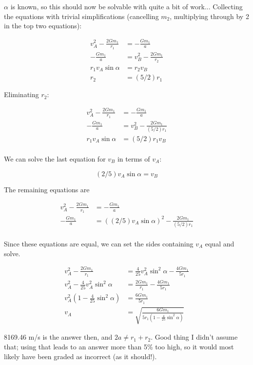 \documentclass[8.01x]{subfiles}
\begin{document}
$\alpha$ is known, so this should now be solvable with quite a bit of work... Collecting the equations with trivial simplifications (cancelling $m_2$, multiplying through by 2 in the top two equations):

\begin{align}
v_A^2 - \frac{2 G m_1}{r_1} &= -\frac{G m_1}{a}\\
-\frac{G m_1}{a} &= v_B^2 - \frac{2 G m_1}{r_2}\\
r_1 v_A \sin \alpha &= r_2 v_B\\
r_2 &= (5/2) r_1
\end{align}

Eliminating $r_2$:

\begin{align}
v_A^2 - \frac{2 G m_1}{r_1} &= -\frac{G m_1}{a}\\
-\frac{G m_1}{a} &= v_B^2 - \frac{2 G m_1}{(5/2) r_1}\\
r_1 v_A \sin \alpha &= (5/2) r_1 v_B\\
\end{align}

We can solve the last equation for $v_B$ in terms of $v_A$:

\begin{equation}
(2/5) v_A \sin \alpha = v_B
\end{equation}

The remaining equations are

\begin{align}
v_A^2 - \frac{2 G m_1}{r_1} &= -\frac{G m_1}{a}\\
-\frac{G m_1}{a} &= ((2/5) v_A \sin \alpha)^2 - \frac{2 G m_1}{(5/2) r_1}\\
\end{align}

Since these equations are equal, we can set the sides containing $v_A$ equal and solve.

\begin{align}
v_A^2 - \frac{2 G m_1}{r_1} &= \frac{4}{25} v_A^2 \sin^2 \alpha - \frac{4 G m_1}{5 r_1}\\
v_A^2 - \frac{4}{25} v_A^2 \sin^2 \alpha &= \frac{2 G m_1}{r_1} - \frac{4 G m_1}{5 r_1}\\
v_A^2 (1 - \frac{4}{25} \sin^2 \alpha) &= \frac{6 G m_1}{5r_1}\\
v_A &= \sqrt{\frac{6 G m_1}{5r_1 (1 - \frac{4}{25} \sin^2 \alpha)}}
\end{align}

8169.46 m/s is the answer then, and $2a \neq r_1 + r_2$. Good thing I didn't assume that; using that leads to an answer more than 5\% too high, so it would most likely have been graded as incorrect (as it should!).
\end{document}
